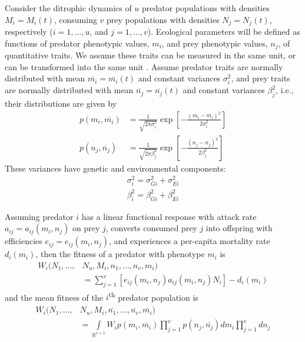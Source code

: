 \documentclass{amsart}
\theoremstyle{definition}
\theoremstyle{remark}
\numberwithin{equation}{section}
\begin{document}
Consider the ditrophic dynamics of $u$ predator populations with densities $M_i = M_i(t)$, consuming $v$ prey populations with densities $N_j = N_j(t)$, respectively ($i = 1, \dots, u$, and $j = 1, \dots, v$).  Ecological parameters will be defined as functions of predator phenotypic values, $m_i$, and prey phenotypic values, $n_j$, of quantitative traits.  We assume these traits can be measured in the same unit, or can be transformed into the same unit \cite{Saloniemi_1993}.  Assume predator traits are normally distributed with mean $\overline{m_i} = \overline{m_i}(t)$ and constant variances $\sigma_i^2$, and prey traits are normally distributed with mean $\overline{n_j} = \overline{n_j}(t)$ and constant variances $\beta_j^2$, i.e., their distributions are given by
\begin{equation}
	\label{distributions}
	\begin{aligned}
		p(m_i, \overline{m_i}) &= \frac{1}{\sqrt{2\pi\sigma_i^2}}\exp\left[-\frac{(m_i - \overline{m_i})^2}{2\sigma_i^2}\right] \\
		p(n_j, \overline{n_j}) &= \frac{1}{\sqrt{2\pi\beta_j^2}}\exp\left[-\frac{(n_j - \overline{n_j})^2}{2\beta_j^2}\right]
	\end{aligned}
\end{equation}
These variances have genetic and environmental components:
\begin{equation}
	\label{variances}
	\begin{aligned}
		\sigma_i^2 = \sigma_{Gi}^2 + \sigma_{Ei}^2 \\
		\beta_i^2 = \beta_{Gi}^2 + \beta_{Ei}^2
	\end{aligned}
\end{equation}

Assuming predator $i$ has a linear functional response with attack rate $a_{ij} = a_{ij}(m_i, n_j)$ on prey $j$, converts consumed prey $j$ into offspring with efficiencies $e_{ij} = e_{ij}(m_i, n_j)$, and experiences a per-capita mortality rate $d_i(m_i)$, then the fitness of a predator with phenotype $m_i$ is
\begin{equation}
	\label{predator_fitness}
	\begin{aligned}
		W_i(N_1, \dots, &N_u, M_i, n_1, \dots, n_v, m_i) \\
		&= \sum\limits_{j = 1}^{v}\left[e_{ij}(m_i, n_j)a_{ij}(m_i, n_j)N_i\right] - d_i(m_i)
	\end{aligned}
\end{equation}
and the mean fitness of the $i$\textsuperscript{th} predator population is
\begin{equation}
	\label{avg_predator_fitness}
	\begin{aligned}
		\overline{W_i}(N_1, \dots, &N_u, M_i, \overline{n_1}, \dots, \overline{n_v}, \overline{m_i}) \\
		&= \int\limits_{\mathbb{R}^{v+1}}^{}W_ip(m_i, \overline{m_i})\prod\limits_{j = 1}^{v}p(n_j, \overline{n_j})dm_i\prod\limits_{j = 1}^{v}dn_j
	\end{aligned}
\end{equation}
\end{document}
